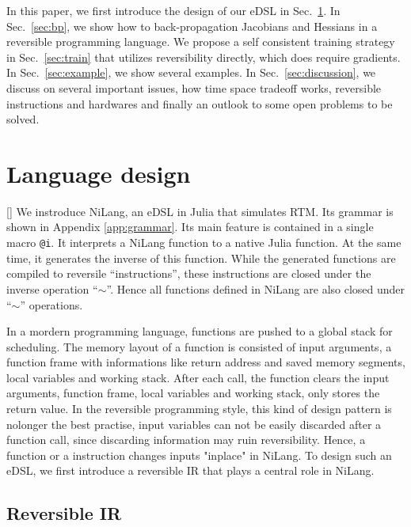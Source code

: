\documentclass[aps,twocolumn,longbibliography,english,superscriptaddress]{revtex4-1}
\newcommand{\<}{\langle}
\renewcommand{\>}{\rangle}
\newcommand{\Sec}[1]{Sec.~\ref{#1}}
\newcommand{\App}[1]{Appendix \ref{#1}}
\newcommand{\green}[1]{[{\bf  \color{green}{TZ: #1}}]}
\theoremstyle{definition}\newtheorem{definition}{\textit{Definition}}
\begin{document}
    In this paper, we first introduce the design of our eDSL in \Sec{sec:lang}.
    In \Sec{sec:bp}, we show how to back-propagation Jacobians and Hessians in a reversible programming language.
    We propose a self consistent training strategy in \Sec{sec:train} that utilizes reversibility directly, which does require gradients.
    In \Sec{sec:example}, we show several examples.
    In \Sec{sec:discussion}, we discuss on several important issues, how time space tradeoff works, reversible instructions and hardwares and finally an outlook to some open problems to be solved.

\section{Language design}\label{sec:lang}
    \green{This is an example of comment!}
We instroduce NiLang, an eDSL in Julia that simulates RTM. Its grammar is shown in \App{app:grammar}.
Its main feature is contained in a single macro \texttt{@i}. It interprets a NiLang function to a native Julia function.
At the same time, it generates the inverse of this function. While the generated functions are compiled to reversile ``instructions'', these instructions are closed under the inverse operation ``$\sim$''. Hence all functions defined in NiLang are also closed under ``$\sim$'' operations.

    In a mordern programming language, functions are pushed to a global stack for scheduling. The memory layout of a function is consisted of input arguments, a function frame with informations like return address and saved memory segments, local variables and working stack. After each call, the function clears the input arguments, function frame, local variables and working stack, only stores the return value.
    In the reversible programming style, this kind of design pattern is nolonger the best practise, input variables can not be easily discarded after a function call, since discarding information may ruin reversibility. Hence, a function or a instruction changes inputs "inplace" in NiLang.
To design such an eDSL, we first introduce a reversible IR that plays a central role in NiLang.

\subsection{Reversible IR}
\end{document}
